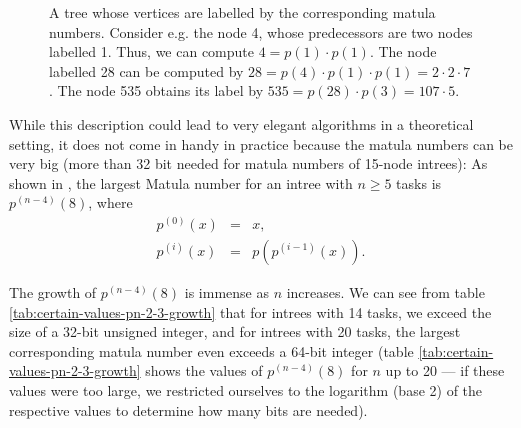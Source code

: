 \begin{description}
\begin{figure}[t]
  \caption{A tree whose vertices are labelled by the corresponding matula numbers. Consider e.g. the node 4, whose predecessors are two nodes labelled 1. Thus, we can compute $4=p(1)\cdot p(1)$. The node labelled 28 can be computed by $28 = p(4)\cdot p(1) \cdot p(1) = 2\cdot 2 \cdot 7$. The node 535 obtains its label by $535=p(28)\cdot p(3) = 107\cdot 5$.}
  \label{fig:matula-illustration}
\end{figure}

While this description could lead to very elegant algorithms in a theoretical setting, it does not come in handy in practice because the matula numbers can be very big (more than 32 bit needed for matula numbers of 15-node intrees): As shown in \cite{onmatulanumbers}, the largest Matula number for an intree with $n\geq 5$ tasks is $p^{(n-4)}(8)$, where
\begin{eqnarray*}
  p^{(0)} (x) &=& x, \\
  p^{(i)}(x) &=& p\left(p^{(i-1)}(x)\right).
\end{eqnarray*}

The growth of $p^{(n-4)}(8)$ is immense as $n$ increases. We can see from table \ref{tab:certain-values-pn-2-3-growth} that for intrees with 14 tasks, we exceed the size of a 32-bit unsigned integer, and for intrees with 20 tasks, the largest corresponding matula number even exceeds a 64-bit integer (table \ref{tab:certain-values-pn-2-3-growth} shows the values of $p^{(n-4)}(8)$ for $n$ up to 20 --- if these values were too large, we restricted ourselves to the logarithm (base 2) of the respective values to determine how many bits are needed).


\end{description}
